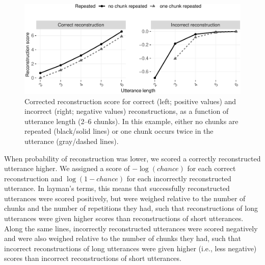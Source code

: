 \documentclass[man,mask,floatsintext]{apa6}
\begin{document}
\begin{figure}
\includegraphics[width=0.95\linewidth]{CBL-age_invariance_files/figure-latex/fig3-1} \caption{Corrected reconstruction score for correct (left; positive values) and incorrect (right; negative values) reconstructions, as a function of utterance length (2--6 chunks). In this example, either no chunks are repeated (black/solid lines) or one chunk occurs twice in the utterance (gray/dashed lines).}\label{fig:fig3}
\end{figure}

When probability of reconstruction was lower, we scored a correctly
reconstructed utterance higher. We assigned a score of \(-\log(chance)\)
for each correct reconstruction and \(\log(1-chance)\) for each
incorrectly reconstructed utterance. In layman's terms, this means that
successfully reconstructed utterances were scored positively, but were
weighed relative to the number of chunks and the number of repetitions
they had, such that reconstructions of long utterances were given higher
scores than reconstructions of short utterances. Along the same lines,
incorrectly reconstructed utterances were scored negatively and were
also weighed relative to the number of chunks they had, such that
incorrect reconstructions of long utterances were given higher (i.e.,
less negative) scores than incorrect reconstructions of short
utterances.
\end{document}
